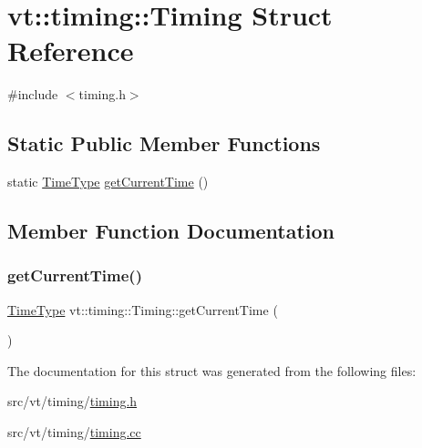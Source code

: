 \hypertarget{structvt_1_1timing_1_1_timing}{}\section{vt\+:\+:timing\+:\+:Timing Struct Reference}
\label{structvt_1_1timing_1_1_timing}


{\ttfamily \#include $<$timing.\+h$>$}

\subsection*{Static Public Member Functions}
\begin{DoxyCompactItemize}
\item 
static \hyperlink{namespacevt_a876a9d0cd5a952859c72de8a46881442}{Time\+Type} \hyperlink{structvt_1_1timing_1_1_timing_a08c67980103a50cd2640f25b8c02b249}{get\+Current\+Time} ()
\end{DoxyCompactItemize}


\subsection{Member Function Documentation}
\mbox{\label{structvt_1_1timing_1_1_timing_a08c67980103a50cd2640f25b8c02b249}} 
\subsubsection{\texorpdfstring{get\+Current\+Time()}{getCurrentTime()}}
{\footnotesize\ttfamily \hyperlink{namespacevt_a876a9d0cd5a952859c72de8a46881442}{Time\+Type} vt\+::timing\+::\+Timing\+::get\+Current\+Time (\begin{DoxyParamCaption}{ }\end{DoxyParamCaption})\hspace{0.3cm}{\ttfamily [static]}}



The documentation for this struct was generated from the following files\+:\begin{DoxyCompactItemize}
\item 
src/vt/timing/\hyperlink{timing_8h}{timing.\+h}\item 
src/vt/timing/\hyperlink{timing_8cc}{timing.\+cc}\end{DoxyCompactItemize}
